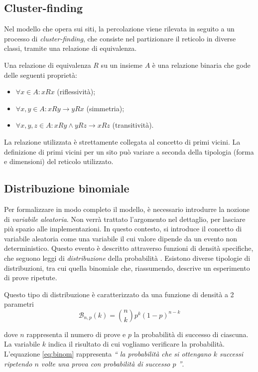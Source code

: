\subsection*{Cluster-finding}
Nel modello che opera sui siti, la percolazione viene rilevata in seguito a un processo 
di \textit{cluster-finding}, che consiste nel partizionare il reticolo in diverse 
classi, tramite una relazione di equivalenza. 
\begin{definition}
Una relazione di equivalenza $R$ su un insieme $A$ è una relazione binaria 
che gode delle seguenti proprietà:
\begin{itemize}
    \item $\forall x \in A : xRx$ (riflessività);
    \item $\forall x,y \in A : xRy \rightarrow yRx$ (simmetria);
    \item $\forall x,y,z \in A: xRy \wedge yRz \rightarrow xRz$ (transitività).
\end{itemize}
\end{definition}
La relazione utilizzata è strettamente collegata al concetto di primi vicini.
La definizione di primi vicini per un sito può variare a seconda della tipologia
(forma e dimensioni) del reticolo utilizzato.

\subsection*{Distribuzione binomiale}
Per formalizzare in modo completo il modello, è necessario introdurre 
la nozione di \textit{variabile aleatoria}. Non verrà trattato l'argomento 
nel dettaglio, per lasciare più spazio alle implementazioni.
In questo contesto, si introduce il concetto di variabile aleatoria come 
una variabile il cui valore dipende da un evento non deterministico.
Questo evento è descritto attraverso funzioni di densità specifiche, che seguono 
leggi di \textit{distribuzione} della probabilità \cite{random}. Esistono diverse 
tipologie di distribuzioni, tra cui quella binomiale che, riassumendo, descrive 
un esperimento di prove ripetute.

Questo tipo di distribuzione è caratterizzato da una funzione di densità 
a 2 parametri
\begin{equation}
    \mathcal{B}_{n, p}(k) = \binom{n}{k} p^k (1-p)^{n-k}
\end{equation}
\label{eq:binom}

dove $n$ rappresenta il numero di prove e $p$ la probabilità di successo di ciascuna.
La variabile $k$ indica il risultato di cui vogliamo verificare la probabilità.
L'equazione \ref{eq:binom} rappresenta \textit{`` la probabilità che si ottengano $k$ successi
ripetendo $n$ volte una prova con probabilità di successo $p$ ''}.